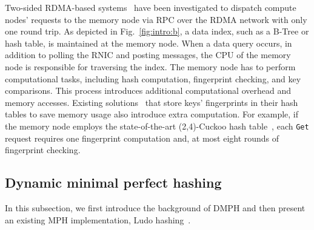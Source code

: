 Two-sided RDMA-based systems~\cite{guidelines,fasst} have been investigated to dispatch compute nodes' requests to the memory node via RPC over the RDMA network with only one round trip. As depicted in Fig.~\ref{fig:intro:b}, a data index, such as a B-Tree or hash table, is maintained at the memory node.
When a data query occurs, in addition to polling the RNIC and posting messages, the CPU of the memory node is responsible for traversing the index. The memory node has to perform computational tasks, including hash computation, fingerprint checking, and key comparisons. This process introduces additional computational overhead and memory accesses.
Existing solutions~\cite{race,drtmr,mica} that store keys' fingerprints in their hash tables to save memory usage also introduce extra computation. 
For example, if the memory node employs the state-of-the-art (2,4)-Cuckoo hash table~\cite{cuckoo}, each \texttt{Get} request requires one fingerprint computation and, at most eight rounds of fingerprint checking.








\vspace{-1ex}
\subsection{Dynamic minimal perfect hashing}
\label{subsec:background:dmph}
In this subsection, we first introduce the background of DMPH and then present an existing MPH implementation, Ludo hashing~\cite{ludo}. 

